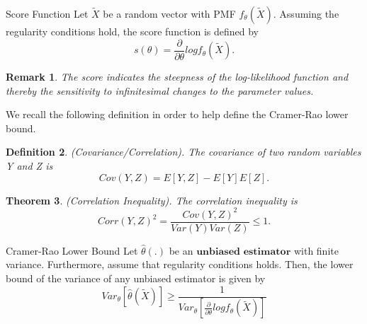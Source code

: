 \documentclass[twoside]{article}
\newcounter{lecnum}
\newtheorem{theorem}{Theorem}[lecnum]
\newtheorem{definition}[theorem]{Definition}
\newtheorem{remark}[theorem]{Remark}
\begin{document}
\begin{definition_exam}{Score Function}{} Let $\tilde{X}$ be a random vector with PMF $f_{\theta}(\tilde{X})$. Assuming the regularity conditions hold, the score function is defined by 
$$
s(\theta) = \frac{\partial}{\partial \theta} log f_{\theta}(\tilde{X}).
$$
\end{definition_exam}


\begin{remark} The score indicates the steepness of the log-likelihood function and thereby the sensitivity to infinitesimal changes to the parameter values.
\end{remark}

We recall the following definition in order to help define the Cramer-Rao lower bound.
\begin{definition}(Covariance/Correlation).  The covariance of two random variables Y and Z is
$$
Cov(Y,Z) = E[Y,Z] - E[Y]E[Z].
$$
\end{definition}

\begin{theorem}(Correlation Inequality). The correlation inequality is 
$$
Corr(Y,Z)^2 = \frac{Cov(Y,Z)^2}{Var(Y)Var(Z)} \leq 1.
$$

\end{theorem}



\begin{definition_exam}{Cramer-Rao Lower Bound}{} Let $\hat{\theta}(.)$ be an $\textbf{unbiased estimator}$ with finite variance. Furthermore, assume that regularity conditions holds. Then, the lower bound of the variance of any unbiased estimator is given by 
$$
Var_{\theta}[\hat{\theta}(\tilde{X})] \geq \frac{1}{Var_{\theta}[\frac{\partial}{\partial \theta}log f_{\theta}(\tilde{X})]}
$$
\end{definition_exam}
\end{document}
